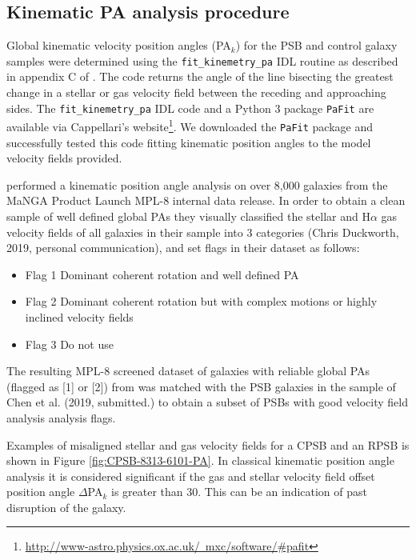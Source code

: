 \subsection{Kinematic PA analysis procedure}
\label{sec:kinemetry-analysis-method-description}
Global kinematic velocity position angles (PA$_{k}$) for the PSB and control galaxy samples were determined using the \texttt{fit\_kinemetry\_pa} IDL routine as described in appendix C of \cite{2006MNRAS.366..787K}. The code returns the angle of the line bisecting the greatest change in a stellar or gas velocity field between the receding and approaching sides. The \texttt{fit\_kinemetry\_pa} IDL code and a Python 3 package \texttt{PaFit} are available via Cappellari's website\footnote{\href{http://www-astro.physics.ox.ac.uk/~mxc/software/\#pafit}{http://www-astro.physics.ox.ac.uk/~mxc/software/\#pafit}}. We downloaded the \texttt{PaFit} package and successfully tested this code fitting kinematic position angles to the model velocity fields provided. 

\cite{2019MNRAS.483..172D} performed a kinematic position angle analysis on over 8,000 galaxies from the MaNGA Product Launch MPL-8 internal data release. In order to obtain a clean sample of well defined global PAs they visually classified the stellar and H$\alpha$ gas velocity fields of all galaxies in their sample into 3 categories (Chris Duckworth, 2019, personal communication), and set flags in their dataset as follows:

\begin{itemize}
    \item {Flag 1}  Dominant coherent rotation and well defined PA
    \item {Flag 2}  Dominant coherent rotation but with complex motions or highly inclined velocity fields 
    \item {Flag 3}  Do not use
\end{itemize}

The resulting MPL-8 screened dataset of galaxies with reliable global PAs (flagged as [1] or [2]) from \cite{2019MNRAS.483..172D} was matched with the PSB galaxies in the sample of Chen et al. (2019, submitted.) to obtain a subset of PSBs with good velocity field analysis analysis flags.

Examples of misaligned stellar and gas velocity fields for a CPSB and an RPSB is shown in Figure \ref{fig:CPSB-8313-6101-PA}. In classical kinematic position angle analysis it is considered significant if the gas and stellar velocity field offset position angle $\Delta$PA$_{k}$ is greater than 30\textdegree. This can be an indication of past disruption of the galaxy.

